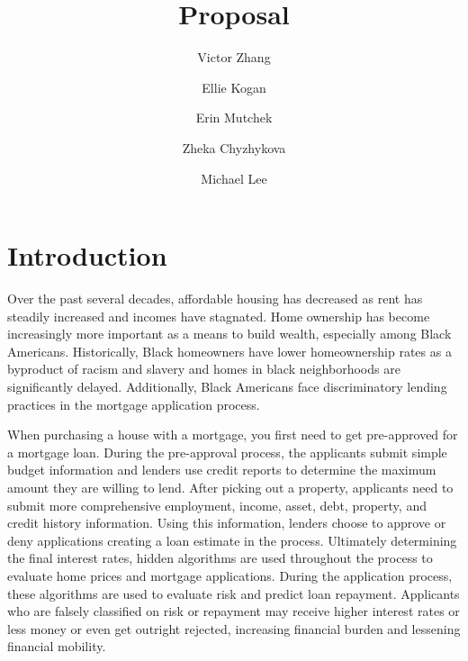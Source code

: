 \documentclass[manuscript,authorversion,nonacm]{acmart} %
\begin{document}
\title[Proposal]{Proposal}


\author{Victor Zhang}
\author{Ellie Kogan}
\author{Erin Mutchek}
\author{Zheka Chyzhykova}
\author{Michael Lee}

\renewcommand{\shortauthors}{Zhang, Kogan, Mutchek, Chyzhykova, Lee}

\maketitle



\section{Introduction}

Over the past several decades, affordable housing has decreased as rent has steadily increased and incomes have stagnated.\cite{localhousing2023} Home ownership has become increasingly more important as a means to build wealth, especially among Black Americans. Historically, Black homeowners have lower homeownership rates as a byproduct of racism and slavery and homes in black neighborhoods are significantly delayed. Additionally, Black Americans face discriminatory lending practices in the mortgage application process.\cite{brookings2023}



When purchasing a house with a mortgage, you first need to get pre-approved for a mortgage loan. During the pre-approval process, the applicants submit simple budget information and lenders use credit reports to determine the maximum amount they are willing to lend. After picking out a property, applicants need to submit more comprehensive employment, income, asset, debt, property, and credit history information.\cite{investopedia2023} Using this information, lenders choose to approve or deny applications creating a loan estimate in the process. Ultimately determining the final interest rates, hidden algorithms are used throughout the process to evaluate home prices and mortgage applications.\cite{mba2024}  During the application process, these algorithms are used to evaluate risk and predict loan repayment. Applicants who are falsely classified on risk or repayment may receive higher interest rates or less money or even get outright rejected, increasing financial burden and lessening financial mobility.
\end{document}
